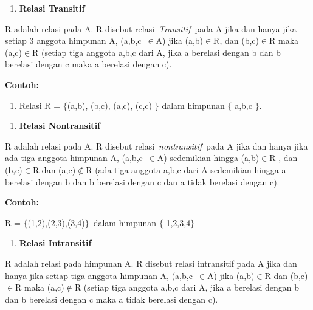 \documentclass[11pt,fleqn]{book} %
\begin{document}
\begin{myEnumerate}
\begin{itemize}
\noindent 

\begin{enumerate}
\item  \textbf{Relasi Transitif}
\end{enumerate}

\noindent 

\noindent R adalah relasi pada A. R disebut relasi~\textit{Transitif}~pada A jika dan hanya jika setiap 3 anggota himpunan A, (a,b,c~$\mathrm{\in }$A) jika (a,b)$\mathrm{\in }$R, dan (b,c)$\mathrm{\in }$R maka (a,c)$\mathrm{\in }$R (setiap tiga anggota a,b,c dari A, jika a berelasi dengan b dan b berelasi dengan c maka a berelasi dengan c).

\noindent \textbf{}

\noindent \textbf{Contoh:}

\begin{enumerate}
\item  Relasi R = $\{$(a,b), (b,c), (a,c), (c,c) $\}$ dalam himpunan $\{$ a,b,c $\}$.
\end{enumerate}

\noindent 

\begin{enumerate}
\item  \textbf{Relasi Nontransitif}
\end{enumerate}

\noindent 

\noindent R adalah relasi pada A. R disebut relasi~\textit{nontransitif}~pada A jika dan hanya jika ada tiga anggota himpunan A, (a,b,c~$\mathrm{\in }$A) sedemikian hingga (a,b)$\mathrm{\in }$R , dan (b,c)$\mathrm{\in }$R dan (a,c)$\mathrm{\notin }$R (ada tiga anggota a,b,c dari A sedemikian hingga a berelasi dengan b dan b berelasi dengan c dan a tidak berelasi dengan c).

\noindent 

\noindent \textbf{Contoh:}

\noindent R = $\{$(1,2),(2,3),(3,4)$\}$~dalam himpunan $\{$ 1,2,3,4$\}$

\noindent 

\begin{enumerate}
\item  \textbf{Relasi Intransitif}
\end{enumerate}

\noindent 

\noindent R adalah relasi pada himpunan A. R disebut relasi intransitif pada A jika dan hanya jika setiap tiga anggota himpunan A, (a,b,c~$\mathrm{\in }$A) jika (a,b)$\mathrm{\in }$R dan (b,c)$\mathrm{\in }$R maka (a,c)$\mathrm{\notin }$R (setiap tiga anggota a,b,c dari A, jika a berelasi dengan b dan b berelasi dengan c maka a tidak berelasi dengan c).


\end{itemize}
\end{myEnumerate}
\end{document}
